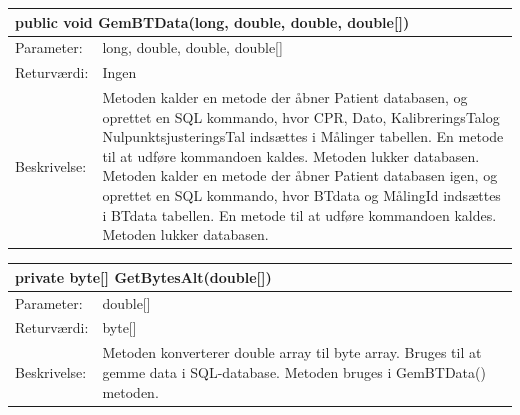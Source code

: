 \begin{table}[H]
\label{tab:tabel2}
\begin{tabular}{| l | p{13cm} |}
   \hline
   \multicolumn{2}{|l|}{public void GemBTData(long, double, double, double[])} \\ \hline
   Parameter: & long, double, double, double[] \\ \hline
   Returværdi: & Ingen\\ \hline
   Beskrivelse: & Metoden kalder en metode der åbner Patient databasen, og oprettet en SQL kommando, hvor CPR, Dato, KalibreringsTalog NulpunktsjusteringsTal indsættes i Målinger tabellen. En metode til at udføre kommandoen kaldes. Metoden lukker databasen. Metoden kalder en metode der åbner Patient databasen igen, og oprettet en SQL kommando, hvor BTdata og MålingId indsættes i BTdata tabellen. En metode til at udføre kommandoen kaldes. Metoden lukker databasen.  \\ \hline
\end{tabular}
\end{table}
\begin{table}[H]
\label{tab:tabel2}
\begin{tabular}{| l | p{13cm} |}
   \hline
   \multicolumn{2}{|l|}{ private byte[] GetBytesAlt(double[])} \\ \hline
   Parameter: & double[] \\ \hline
   Returværdi: & byte[]\\ \hline
   Beskrivelse: & Metoden konverterer double array til byte array. Bruges til at gemme data i SQL-database. Metoden bruges i GemBTData() metoden. \\ \hline
\end{tabular}
\end{table}

